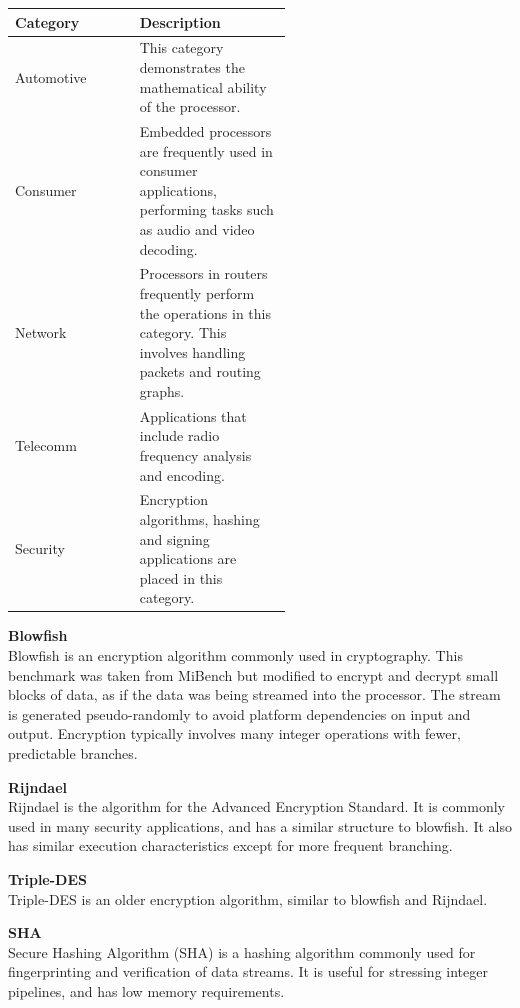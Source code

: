 \documentclass[twocolumn]{article}
\begin{document}
\begin{center}
	\begin{supertabular}{l p{0.55\linewidth}}
		Category &	Description \\
		\hline
		Automotive 	& This category demonstrates the mathematical ability of the processor. \\
		Consumer	& Embedded processors are frequently used in consumer applications, performing tasks such as audio and video decoding. \\
		Network		& Processors in routers frequently perform the operations in this category. This involves handling packets and routing graphs. \\
		Telecomm	& Applications that include radio frequency analysis and encoding. \\
		Security	& Encryption algorithms, hashing and signing applications are placed in this category. \\
	\end{supertabular}
\end{center}

\vspace{3mm}
\textbf{Blowfish}\\
Blowfish is an encryption algorithm commonly used in cryptography. This benchmark was taken from MiBench but modified to encrypt and decrypt small blocks of data, as if the data was being streamed into the processor. The stream is generated pseudo-randomly to avoid platform dependencies on input and output. Encryption typically involves many integer operations with fewer, predictable branches.

\vspace{3mm}
\textbf{Rijndael}\\
Rijndael is the algorithm for the Advanced Encryption Standard. It is commonly used in many security applications, and has a similar structure to blowfish. It also has similar execution characteristics except for more frequent branching.

\vspace{3mm}
\textbf{Triple-DES}\\
Triple-DES is an older encryption algorithm, similar to blowfish and Rijndael.

\vspace{3mm}
\textbf{SHA}\\
Secure Hashing Algorithm (SHA) is a hashing algorithm commonly used for fingerprinting and verification of data streams. It is useful for stressing integer pipelines, and has low memory requirements.
\end{document}
